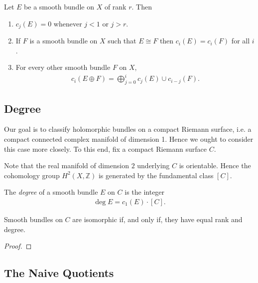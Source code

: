 \documentclass[12pt]{ociamthesis}  %
\begin{document}
\begin{lemma}\missingcitation
  Let $E$ be a smooth bundle on $X$ of rank $r$. Then
  \begin{enumerate}
    \item $c_j(E) = 0$ whenever $j<1$ or $j>r$.
    \item If $F$ is a smooth bundle on $X$ such that $E\cong F$
          then $c_i(E) = c_i(F)$ for all $i$.
    \item For every other smooth bundle $F$ on $X$,
          \begin{align*}
            c_i(E\oplus F) = \bigoplus_{j=0}^{i} c_j(E)\cup c_{i-j}(F).
          \end{align*}
  \end{enumerate}
\end{lemma}

\subsection{Degree}

Our goal is to classify holomorphic bundles on a compact Riemann surface,
i.e. a compact connected complex manifold of dimension 1. Hence we
ought to consider this case more closely. To this end, fix a compact
Riemann surface $C$.


Note that the real manifold of dimension $2$ underlying $C$ is orientable. \missingcitation
Hence the cohomology group $H^2(X,\mathbb{Z})$ is generated by the
fundamental class $[C]$.

\begin{definition}
  The \emph{degree} of a smooth bundle $E$ on $C$ is the integer
  \begin{align*}
    \deg E = c_1(E)\cdot[C].
  \end{align*}
\end{definition}

\begin{theorem}
  Smooth bundles on $C$ are isomorphic if, and only if, they have
  equal rank and degree.
  \begin{proof}
    \missingproof
  \end{proof}
\end{theorem}

\missingsection

\subsection{The Naive Quotients}
\end{document}
